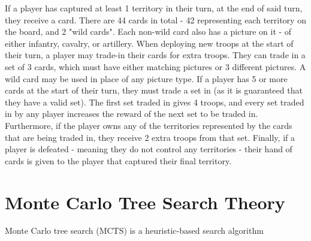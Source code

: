 If a player has captured at least 1 territory in their turn, at the end of said turn, they receive a card. There are 44 cards in total - 42 representing each territory on the board, and 2 "wild cards". Each non-wild card also has a picture on it - of either infantry, cavalry, or artillery. When deploying new troops at the start of their turn, a player may trade-in their cards for extra troops. They can trade in a set of 3 cards, which must have either matching pictures or 3 different pictures. A wild card may be used in place of any picture type. If a player has 5 or more cards at the start of their turn, they must trade a set in (as it is guaranteed that they have a valid set). The first set traded in gives 4 troops, and every set traded in by any player increases the reward of the next set to be traded in. Furthermore, if the player owns any of the territories represented by the cards that are being traded in, they receive 2 extra troops from that set. Finally, if a player is defeated - meaning they do not control any territories - their hand of cards is given to the player that captured their final territory.

\section{Monte Carlo Tree Search Theory}
\label{MCTSTheory}

Monte Carlo tree search (MCTS) is a heuristic-based search algorithm